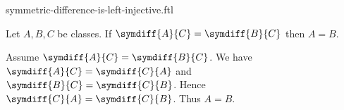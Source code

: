 \documentclass{article}
\begin{document}
\begin{smodule}[creators={Marcel Schütz}]{symmetric-difference-is-left-injective.ftl}

  \begin{fproposition*}[label=2987537536647168]
    Let $A, B, C$ be classes.
    If $\symdiff{A}{C} = \symdiff{B}{C}$ then $A = B$.
  \end{fproposition*}
  \begin{fproof}
    Assume $\symdiff{A}{C} = \symdiff{B}{C}$.
    We have $\symdiff{A}{C} = \symdiff{C}{A}$ and $\symdiff{B}{C} = \symdiff{C}{B}$.
    Hence $\symdiff{C}{A} = \symdiff{C}{B}$.
    Thus $A = B$.
  \end{fproof}
\end{smodule}
\end{document}

